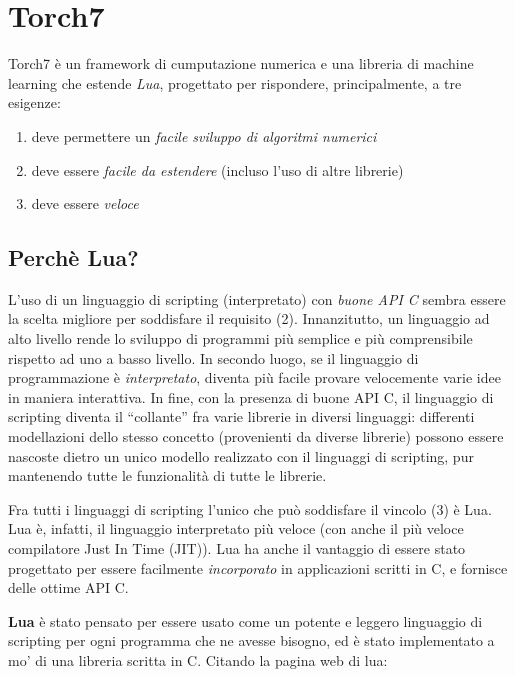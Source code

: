 \section{Torch7}
\label{sec:torch}
\nocite{Collobert:2011}

Torch7 \`e un framework di cumputazione numerica e una libreria di machine learning
che estende \emph{Lua}, progettato per rispondere, principalmente, a tre esigenze:

\begin{enumerate}
  \item deve permettere un \emph{facile sviluppo di algoritmi numerici}
  \item deve essere \emph{facile da estendere} (incluso l'uso di altre librerie)
  \item deve essere \emph{veloce}
\end{enumerate}

\subsection{Perch\`e Lua?}
L'uso di un linguaggio di scripting (interpretato) con \emph{buone API C} sembra
essere la scelta migliore per soddisfare il requisito (2). Innanzitutto, un
linguaggio ad alto livello rende lo sviluppo di programmi pi\`u semplice e pi\`u
comprensibile rispetto ad uno a basso livello. In secondo luogo, se il linguaggio
di programmazione \`e \emph{interpretato}, diventa pi\`u facile provare velocemente
varie idee in maniera interattiva. In fine, con la presenza di buone API C, il
linguaggio di scripting diventa il ``collante'' fra varie librerie in diversi
linguaggi: differenti modellazioni dello stesso concetto (provenienti da diverse
librerie) possono essere nascoste dietro un unico modello realizzato con il
linguaggi di scripting, pur mantenendo tutte le funzionalit\`a di tutte le librerie.

Fra tutti i linguaggi di scripting l'unico che pu\`o soddisfare il vincolo (3)
\`e Lua. Lua \`e, infatti, il linguaggio interpretato pi\`u veloce (con anche il
pi\`u veloce compilatore Just In Time (JIT)). Lua ha anche il vantaggio di essere
stato progettato per essere facilmente \emph{incorporato} in applicazioni scritti
in C, e fornisce delle ottime API C.

\textbf{Lua} \`e stato pensato per essere usato come un potente e leggero
linguaggio di scripting per ogni programma che ne avesse bisogno, ed \`e stato
implementato a mo' di una libreria scritta in C. Citando la pagina web di lua:

